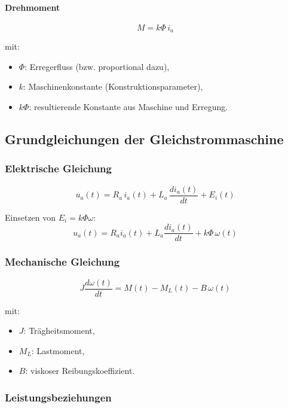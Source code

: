 \paragraph{Drehmoment}
\[
\boxed{M = k\Phi\,i_a}
\]

mit:
\begin{itemize}
    \item $\Phi$: Erregerfluss (bzw. proportional dazu),
    \item $k$: Maschinenkonstante (Konstruktionsparameter),
    \item $k\Phi$: resultierende Konstante aus Maschine und Erregung.
\end{itemize}


\subsection{Grundgleichungen der Gleichstrommaschine}

\subsubsection{Elektrische Gleichung}

\[
\boxed{u_a(t) = R_a\, i_a(t) + L_a\, \frac{di_a(t)}{dt} + E_i(t)}
\]

Einsetzen von $E_i=k\Phi\omega$:
\[
\boxed{u_a(t) = R_a i_a(t) + L_a\frac{di_a(t)}{dt} + k\Phi\,\omega(t)}
\]

\subsubsection{Mechanische Gleichung}

\[
\boxed{J\frac{d\omega(t)}{dt} = M(t) - M_L(t) - B\,\omega(t)}
\]

mit:
\begin{itemize}
    \item $J$: Trägheitsmoment,
    \item $M_L$: Lastmoment,
    \item $B$: viskoser Reibungskoeffizient.
\end{itemize}

\subsubsection{Leistungsbeziehungen}


